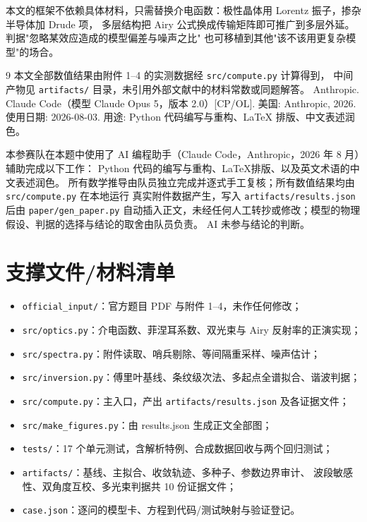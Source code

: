 \documentclass[12pt]{article}
\begin{document}
本文的框架不依赖具体材料，只需替换介电函数：极性晶体用 Lorentz 振子，掺杂半导体加 Drude 项，
多层结构把 Airy 公式换成传输矩阵即可推广到多层外延。判据"忽略某效应造成的模型偏差与噪声之比"
也可移植到其他"该不该用更复杂模型"的场合。

\begin{thebibliography}{9}
 本文全部数值结果由附件 1--4 的实测数据经 \texttt{src/compute.py} 计算得到，
中间产物见 \texttt{artifacts/} 目录，未引用外部文献中的材料常数或同题解答。
 Anthropic. Claude Code（模型 Claude Opus 5，版本 2.0）[CP/OL].
美国: Anthropic, 2026. 使用日期: 2026-08-03.
用途: Python 代码编写与重构、\LaTeX{} 排版、中文表述润色。
\end{thebibliography}

\begin{aideclaration}[AI 工具使用声明]
本参赛队在本题中使用了 AI 编程助手（Claude Code，Anthropic，2026 年 8 月）辅助完成以下工作：
Python 代码的编写与重构、\LaTeX 排版、以及英文术语的中文表述润色。
所有数学推导由队员独立完成并逐式手工复核；所有数值结果均由 \texttt{src/compute.py} 在本地运行
真实附件数据产生，写入 \texttt{artifacts/results.json} 后由 \texttt{paper/gen\_paper.py}
自动插入正文，未经任何人工转抄或修改；模型的物理假设、判据的选择与结论的取舍由队员负责。
AI 未参与结论的判断。
\end{aideclaration}

\appendix
\section{支撑文件/材料清单}

\begin{itemize}[leftmargin=2em]
  \item \texttt{official\_input/}：官方题目 PDF 与附件 1--4，未作任何修改；
  \item \texttt{src/optics.py}：介电函数、菲涅耳系数、双光束与 Airy 反射率的正演实现；
  \item \texttt{src/spectra.py}：附件读取、哨兵剔除、等间隔重采样、噪声估计；
  \item \texttt{src/inversion.py}：傅里叶基线、条纹级次法、多起点全谱拟合、谐波判据；
  \item \texttt{src/compute.py}：主入口，产出 \texttt{artifacts/results.json} 及各证据文件；
  \item \texttt{src/make\_figures.py}：由 results.json 生成正文全部图；
  \item \texttt{tests/}：{17} 个单元测试，含解析特例、合成数据回收与两个回归测试；
  \item \texttt{artifacts/}：基线、主拟合、收敛轨迹、多种子、参数边界审计、
        波段敏感性、双角度互校、多光束判据共 10 份证据文件；
  \item \texttt{case.json}：逐问的模型卡、方程到代码/测试映射与验证登记。
\end{itemize}
\end{document}
